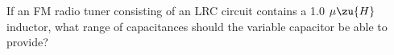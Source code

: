 If an FM radio tuner consisting of an LRC circuit
        contains a 1.0 $\mu\zu{H}$ inductor,  what range of
        capacitances should the variable capacitor be able to provide?\answercheck
